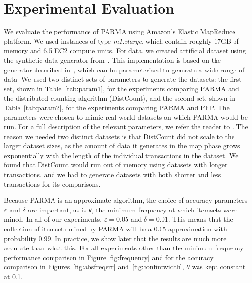 \section{Experimental Evaluation}
\label{sec:eval}

We evaluate the performance of PARMA using Amazon's Elastic
MapReduce platform. We used instances of type \emph{m1.xlarge}, which
contain roughly 17GB of memory and 6.5 EC2 compute units.
For data, we created artificial dataset using the synthetic data
generator from~\cite{ARTool}. This implementation is based on the
generator described in~\cite{AgrawalS94}, which can be parameterized to generate a wide
range of data. We used two distinct sets of parameters to generate the
datasets: the first set, shown in Table~\ref{tab:param1}, for the experiments
comparing PARMA and the distributed counting algorithm
(DistCount), and the second set, shown in Table~\ref{tab:param2},
for the experiments comparing PARMA and PFP.
The parameters were
chosen to mimic real-world datasets on which PARMA would be run. For a
full description of the relevant parameters, we refer the reader to
\cite{AgrawalS94}.  
The reason we needed two distinct datasets is that DistCount did not scale to
the larger dataset sizes,  as the amount of data it generates in the map phase
grows exponentially with the length of the individual transactions in the
dataset.  We found that DistCount would run out of memory using datasets with
longer transactions, and we had to generate datasets with both shorter and less
transactions for its comparisons. 

Because PARMA is an approximate algorithm, the choice of accuracy
parameters $\varepsilon$ and $\delta$ are important, as is $\theta$,
the minimum frequency at which itemsets were mined. In all of our
experiments, $\varepsilon = 0.05$ and $\delta = 0.01$. This means that
the collection of itemsets mined by PARMA will be a 0.05-approximation with
probability 0.99. In practice, we show later that the results are
much more accurate than what this. For all experiments other than the
minimum frequency performance comparison in Figure \ref{fig:frequency} and for
the accuracy comparison in Figures~\ref{fig:absfreqerr}
and~\ref{fig:confintwidth}, $\theta$ was kept constant at 0.1.

